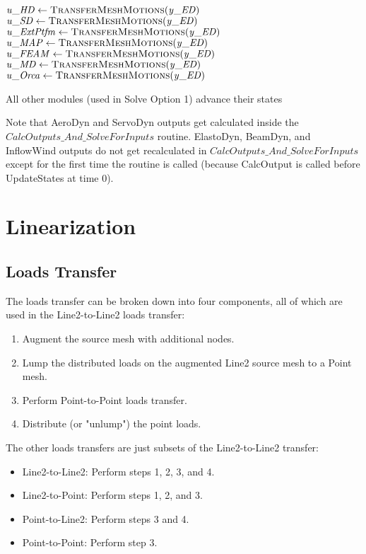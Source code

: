 \documentclass[10pt,letterpaper,oneside,notitlepage]{article}
\begin{document}
\begin{algorithmic}[1]
   \State $\mathit{u\_HD}   \gets \Call{TransferMeshMotions}{\mathit{y\_ED}}$
   \State $\mathit{u\_SD}   \gets \Call{TransferMeshMotions}{\mathit{y\_ED}}$
   \State $\mathit{u\_ExtPtfm}   \gets \Call{TransferMeshMotions}{\mathit{y\_ED}}$
   \State $\mathit{u\_MAP}  \gets \Call{TransferMeshMotions}{\mathit{y\_ED}}$
   \State $\mathit{u\_FEAM} \gets \Call{TransferMeshMotions}{\mathit{y\_ED}}$
   \State $\mathit{u\_MD}   \gets \Call{TransferMeshMotions}{\mathit{y\_ED}}$
   \State $\mathit{u\_Orca} \gets \Call{TransferMeshMotions}{\mathit{y\_ED}}$

\State

\State All other modules (used in Solve Option 1) advance their states
\EndProcedure
\end{algorithmic}

Note that AeroDyn and ServoDyn outputs get calculated inside the ${CalcOutputs\_And\_SolveForInputs}$ routine. ElastoDyn, BeamDyn, and
InflowWind outputs do not get recalculated in ${CalcOutputs\_And\_SolveForInputs}$ except for the first time the routine is called
(because CalcOutput is called before UpdateStates at time 0).



\section {Linearization}
\subsection{Loads Transfer}
The loads transfer can be broken down into four components, all of which are used in the Line2-to-Line2 loads transfer:
\begin{enumerate}
  \item Augment the source mesh with additional nodes.
  \item Lump the distributed loads on the augmented Line2 source mesh to a Point mesh.
  \item Perform Point-to-Point loads transfer.
  \item Distribute (or "unlump") the point loads.   
\end{enumerate}
The other loads transfers are just subsets of the Line2-to-Line2 transfer:
\begin{itemize}
  \item Line2-to-Line2: Perform steps 1, 2, 3, and 4.
  \item Line2-to-Point: Perform steps 1, 2, and 3.
  \item Point-to-Line2: Perform steps 3 and 4.
  \item Point-to-Point: Perform step 3.
\end{itemize}
\end{document}
